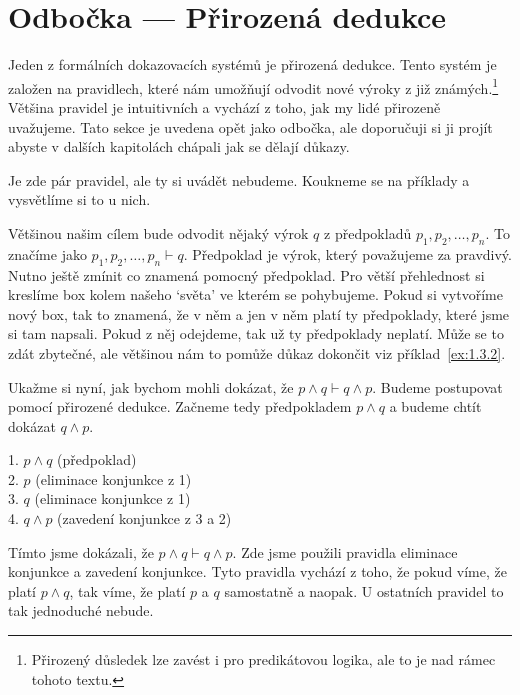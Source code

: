 \section{Odbočka --- Přirozená dedukce}
Jeden z formálních dokazovacích systémů je přirozená dedukce. Tento systém je založen na pravidlech, které nám umožňují odvodit nové výroky z již známých.\footnote{Přirozený důsledek lze zavést i pro predikátovou logika, ale to je nad rámec tohoto textu.} Většina pravidel je intuitivních a vychází z toho, jak my lidé přirozeně uvažujeme. Tato sekce je uvedena opět jako odbočka, ale doporučuji si ji projít abyste v dalších kapitolách chápali jak se dělají důkazy.

Je zde pár pravidel, ale ty si uvádět nebudeme. Koukneme se na příklady a vysvětlíme si to u nich.

\begin{definitionbox}
  Většinou našim cílem bude odvodit nějaký výrok $q$ z předpokladů $p_1, p_2, \ldots, p_n$. To značíme jako $p_1, p_2, \ldots, p_n \vdash q$.  Předpoklad je výrok, který považujeme za pravdivý. Nutno ještě zmínit co znamená pomocný předpoklad. Pro větší přehlednost si kreslíme box kolem našeho `světa' ve kterém se pohybujeme. Pokud si vytvoříme nový box, tak to znamená, že v něm a jen v něm platí ty předpoklady, které jsme si tam napsali. Pokud z něj odejdeme, tak už ty předpoklady neplatí. Může se to zdát zbytečné, ale většinou nám to pomůže důkaz dokončit viz příklad~\ref{ex:1.3.2}.
\end{definitionbox}

\begin{example}
  Ukažme si nyní, jak bychom mohli dokázat, že $p \land q \vdash q \land p$. Budeme postupovat pomocí přirozené dedukce. Začneme tedy předpokladem $p \land q$ a budeme chtít dokázat $q \land p$. 
  \begin{proofbox}
    1. $p \land q$ (předpoklad) \\
    2. $p$ (eliminace konjunkce z 1) \\
    3. $q$ (eliminace konjunkce z 1) \\
    4. $q \land p$ (zavedení konjunkce z 3 a 2)
  \end{proofbox}
  Tímto jsme dokázali, že $p \land q \vdash q \land p$. Zde jsme použili pravidla eliminace konjunkce a zavedení konjunkce. Tyto pravidla vychází z toho, že pokud víme, že platí $p \land q$, tak víme, že platí $p$ a $q$ samostatně a naopak. U ostatních pravidel to tak jednoduché nebude.
\end{example}

